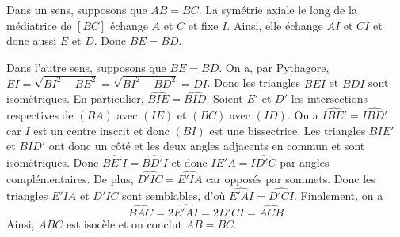 Dans un sens, supposons que $AB = BC$. La symétrie axiale le long de la médiatrice de $[BC]$ échange $A$ et $C$ et fixe $I$. Ainsi, elle échange $AI$ et $CI$ et donc aussi $E$ et $D$. Donc $BE = BD$.

Dans l'autre sens, supposons que $BE = BD$. On a, par Pythagore, $EI = \sqrt{BI^2 - BE^2} = \sqrt{BI^2 - BD^2} = DI$. Donc les triangles $BEI$ et $BDI$ sont isométriques. En particulier, $\widehat{BIE} = \widehat{BID}$. Soient $E'$ et $D'$ les intersections respectives de $(BA)$ avec $(IE)$ et $(BC)$ avec $(ID)$. On a $\widehat{IBE'} = \widehat{IBD'}$ car $I$ est un centre inscrit et donc $(BI)$ est une bissectrice. Les triangles $BIE'$ et $BID'$  ont donc un côté et les deux angles adjacents en commun et sont isométriques. Donc $\widehat{BE'I} = \widehat{BD'I}$ et donc $\widehat{IE'A} = \widehat{ID'C}$ par angles complémentaires. De plus, $\widehat{D'IC} = \widehat{E'IA}$ car opposés par sommets. Donc les triangles $E'IA$ et $D'IC$ sont semblables, d'où $\widehat{E'AI} = \widehat{D'CI}$. Finalement, on a
$$\widehat{BAC} = 2\widehat{E'AI} = 2\widehat{D'CI} = \widehat{ACB}$$
Ainsi, $ABC$ est isocèle et on conclut $AB = BC$.